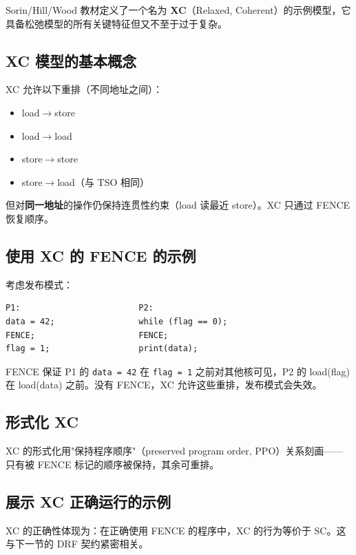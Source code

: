 Sorin/Hill/Wood 教材定义了一个名为 \textbf{XC}（Relaxed, Coherent）的示例模型，它具备松弛模型的所有关键特征但又不至于过于复杂。

\subsection{XC 模型的基本概念}

XC 允许以下重排（不同地址之间）：

\begin{itemize}
\item load$\rightarrow$store
\item load$\rightarrow$load
\item store$\rightarrow$store
\item store$\rightarrow$load（与 TSO 相同）
\end{itemize}


但对\textbf{同一地址}的操作仍保持连贯性约束（load 读最近 store）。XC 只通过 FENCE 恢复顺序。

\subsection{使用 XC 的 FENCE 的示例}

考虑发布模式：

\begin{verbatim}
P1:                        P2:
data = 42;                 while (flag == 0);
FENCE;                     FENCE;
flag = 1;                  print(data);
\end{verbatim}


FENCE 保证 P1 的 \texttt{data = 42} 在 \texttt{flag = 1} 之前对其他核可见，P2 的 load(flag) 在 load(data) 之前。没有 FENCE，XC 允许这些重排，发布模式会失效。

\subsection{形式化 XC}

XC 的形式化用"保持程序顺序"（preserved program order, PPO）关系刻画——只有被 FENCE 标记的顺序被保持，其余可重排。

\subsection{展示 XC 正确运行的示例}

XC 的正确性体现为：在正确使用 FENCE 的程序中，XC 的行为等价于 SC。这与下一节的 DRF 契约紧密相关。

